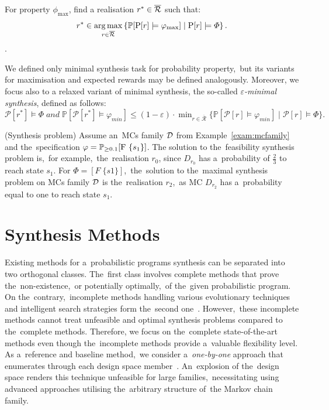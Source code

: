 \begin{definition}[Minimality]
For property $\phi_{\max}$, find a realisation $r^* \in \overline{\mathcal{R}}$ such that:
$$r^* \in \operatorname*{arg\,max}_{r \in \overline{\mathcal{R}}} \left \{ \mathbb{P}[\mathrm{P}[r] \models \varphi_{\max}] \mid \mathrm{P}[r] \models \varPhi \right \}.$$.
\end{definition}

We defined only minimal synthesis task for probability property,~but its variants for maximisation and expected rewards may be defined analogously.
Moreover, we focus also to a relaxed variant of minimal synthesis, the so-called \textit{$\varepsilon$-minimal synthesis}, defined as follows: $\mathcal{P}[r^*] \models \varPhi \; and \; 
\mathbb{P}[\mathcal{P}[r^*] \models \varphi_{min}] \leq (1 - \varepsilon) \cdot \min_{r \in \mathcal{\overline{R}}} \{ \mathbb{P}[\mathcal{P}[r] \models \varphi_{min}] \; \lvert \; \mathcal{P}[r] \models \varPhi \}.$

\begin{example} (Synthesis problem)
Assume an~MCs family $\mathcal{D}$ from Example~\ref{exam:mcfamily} and the~specification $\varphi = \mathbb{P}_{\geq 0.1}[\mathrm{F}\ \{s_1\}]$.
The solution to the~feasibility synthesis problem is,~for example,~the~realisation $r_0$, since $D_{r_0}$ has a~probability of $\frac{2}{3}$ to reach state $s_1$.
For $\varPhi = [F \; \{s1\}]$,~the~solution to the~maximal synthesis problem on MCs family $\mathcal{D}$ is the~realisation $r_2$,~as MC $D_{r_2}$ has a~probability equal to one to reach state $s_1$.
\end{example}

\section{Synthesis Methods}
Existing methods for a~probabilistic programs synthesis can be separated into two orthogonal classes.
The~first class involves complete methods that prove the~non-existence,~or potentially optimally,~of the~given probabilistic program.
On the~contrary,~incomplete methods handling various evolutionary techniques and intelligent search strategies form the~second one~\cite{spl2}.
However,~these incomplete methods cannot treat unfeasible and optimal synthesis problems compared to the~complete methods.
Therefore, we focus on the~complete state-of-the-art methods even though the~incomplete methods provide a~valuable flexibility level.
As a~reference and baseline method,~we consider a~\textit{one-by-one} approach that enumerates through each design space member~\cite{onebyone}.
An~explosion of the~design space renders this technique unfeasible for large families,~necessitating using advanced approaches utilising the~arbitrary structure of~the Markov chain family.


